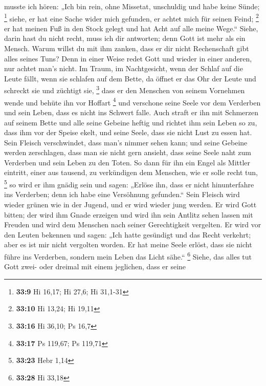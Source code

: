 musste ich hören:  „Ich bin rein, ohne Missetat, unschuldig
und habe keine Sünde; \footnote{\textbf{33:9} Hi 16,17; Hi 27,6; Hi
  31,1-31}  siehe, er hat eine Sache wider mich gefunden,
er achtet mich für seinen Feind; \footnote{\textbf{33:10} Hi 13,24; Hi
  19,11}  er hat meinen Fuß in den Stock gelegt und hat
Acht auf alle meine Wege.``  Siehe, darin hast du nicht
recht, muss ich dir antworten; denn Gott ist mehr als ein Mensch.
 Warum willst du mit ihm zanken, dass er dir nicht
Rechenschaft gibt alles seines Tuns?  Denn in einer Weise
redet Gott und wieder in einer anderen, nur achtet man's nicht.
 Im Traum, im Nachtgesicht, wenn der Schlaf auf die Leute
fällt, wenn sie schlafen auf dem Bette,  da öffnet er das
Ohr der Leute und schreckt sie und züchtigt sie, \footnote{\textbf{33:16}
  Hi 36,10; Ps 16,7}  dass er den Menschen von seinem
Vornehmen wende und behüte ihn vor Hoffart \footnote{\textbf{33:17} Ps
  119,67; Ps 119,71}  und verschone seine Seele vor dem
Verderben und sein Leben, dass es nicht ins Schwert falle. 
Auch straft er ihn mit Schmerzen auf seinem Bette und alle seine Gebeine
heftig  und richtet ihm sein Leben so zu, dass ihm vor der
Speise ekelt, und seine Seele, dass sie nicht Lust zu essen hat.
 Sein Fleisch verschwindet, dass man's nimmer sehen kann;
und seine Gebeine werden zerschlagen, dass man sie nicht gern ansieht,
 dass seine Seele naht zum Verderben und sein Leben zu den
Toten.  So dann für ihn ein Engel als Mittler eintritt,
einer aus tausend, zu verkündigen dem Menschen, wie er solle recht tun,
\footnote{\textbf{33:23} Hebr 1,14}  so wird er ihm gnädig
sein und sagen: „Erlöse ihn, dass er nicht hinunterfahre ins Verderben;
denn ich habe eine Versöhnung gefunden.``  Sein Fleisch
wird wieder grünen wie in der Jugend, und er wird wieder jung werden.
 Er wird Gott bitten; der wird ihm Gnade erzeigen und wird
ihn sein Antlitz sehen lassen mit Freuden und wird dem Menschen nach
seiner Gerechtigkeit vergelten.  Er wird vor den Leuten
bekennen und sagen: „Ich hatte gesündigt und das Recht verkehrt; aber es
ist mir nicht vergolten worden.  Er hat meine Seele erlöst,
dass sie nicht führe ins Verderben, sondern mein Leben das Licht sähe.``
\footnote{\textbf{33:28} Hi 33,18}  Siehe, das alles tut
Gott zwei- oder dreimal mit einem jeglichen,  dass er seine
